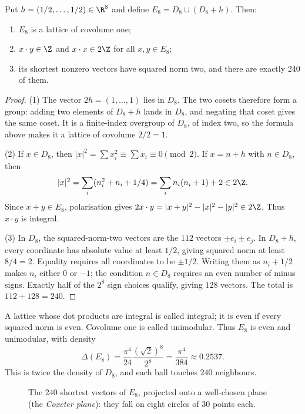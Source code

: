 \begin{theorem}\label{geometry:thm:e8}
Put $h=(1/2,\ldots,1/2)\in\R^8$ and define $E_8=D_8\cup(D_8+h)$.
Then:
\begin{enumerate}
\item $E_8$ is a lattice of covolume one;
\item $x\cdot y\in\Z$ and $x\cdot x\in2\Z$ for all $x,y\in E_8$;
\item its shortest nonzero vectors have squared norm two, and there are
exactly $240$ of them.
\end{enumerate}
\end{theorem}
\begin{proof}
(1) The vector $2h=(1,\ldots,1)$ lies in $D_8$.
The two cosets therefore form a group: adding two elements of $D_8+h$
lands in $D_8$, and negating that coset gives the same coset.
It is a finite-index overgroup of $D_8$, of index two, so the formula
above makes it a lattice of covolume $2/2=1$.

(2) If $x\in D_8$, then
$|x|^2=\sum x_i^2\equiv\sum x_i\equiv0\pmod2$.
If $x=n+h$ with $n\in D_8$, then
\[
 |x|^2=\sum_i(n_i^2+n_i+1/4)=\sum_i n_i(n_i+1)+2\in2\Z.
\]
Since $x+y\in E_8$, polarisation gives
$2x\cdot y=|x+y|^2-|x|^2-|y|^2\in2\Z$.
Thus $x\cdot y$ is integral.

(3) In $D_8$, the squared-norm-two vectors are the $112$ vectors
$\pm e_i\pm e_j$. In $D_8+h$, every coordinate has absolute value
at least $1/2$, giving squared norm at least $8/4=2$.
Equality requires all coordinates to be $\pm1/2$.
Writing them as $n_i+1/2$ makes $n_i$ either $0$ or $-1$;
the condition $n\in D_8$ requires an even number of minus signs.
Exactly half of the $2^8$ sign choices qualify, giving $128$ vectors.
The total is $112+128=240$.
\end{proof}

A lattice whose dot products are integral is called integral; it is even
if every squared norm is even. Covolume one is called unimodular.
Thus $E_8$ is even and unimodular, with density
\[
 \Delta(E_8)=\frac{\pi^4}{24}\frac{(\sqrt2)^8}{2^8}
 =\frac{\pi^4}{384}\approx0.2537.
\]
This is twice the density of $D_8$, and each ball touches $240$ neighbours.

\begin{figure}[ht]
\centering
{}
\caption{The $240$ shortest vectors of $E_8$, projected onto a well-chosen plane (the \emph{Coxeter plane}): they fall on eight circles of $30$ points each.}
\label{geometry:fig:e8}
\end{figure}

